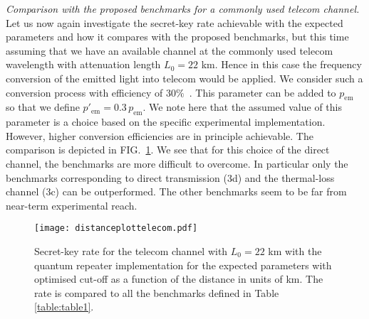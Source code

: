 \documentclass[aps,pra,reprint,superscriptaddress]{revtex4-1}
\begin{document}
\textit{Comparison with the proposed benchmarks for a commonly used telecom channel.}
Let us now again investigate the secret-key rate achievable with the expected parameters and how it compares with the proposed benchmarks, but this time assuming that we have an available channel at the commonly used telecom wavelength with attenuation length $L_0 = 22$ km. Hence in this case the frequency conversion of the emitted light into telecom would be applied. We consider such a conversion process with efficiency of $30 \%$~\cite{zaske2012visible}. This parameter can be added to $p_{\textrm{em}}$ so that we define $p'_{\textrm{em}} = 0.3 \, p_{\textrm{em}}$. We note here that the assumed value of this parameter is a choice based on the specific experimental implementation. However, higher conversion efficiencies are in principle achievable. The comparison is depicted in FIG.~\ref{fig:distanceplottelecom}. We see that for this choice of the direct channel, the benchmarks are more difficult to overcome. In particular only the benchmarks corresponding to direct transmission (3d) and the thermal-loss channel (3c) can be outperformed. The other benchmarks seem to be far from near-term experimental reach.

\begin{figure}[h]
\centering
\texttt{[image: distanceplottelecom.pdf]}
\caption{Secret-key rate for the telecom channel with $L_0 = 22$ km with the quantum repeater implementation for the expected parameters with optimised cut-off as a function of the distance in units of km. 
The rate is compared to all the benchmarks defined in Table \ref{table:table1}.}
\label{fig:distanceplottelecom}
\end{figure}
\end{document}
